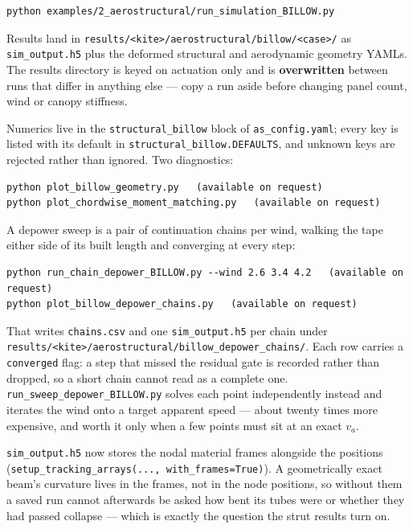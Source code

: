 \documentclass[11pt,a4paper]{article}
\newcommand{\code}[1]{\texttt{\small #1}}
\begin{document}
\begin{verbatim}
python examples/2_aerostructural/run_simulation_BILLOW.py
\end{verbatim}

Results land in \code{results/<kite>/aerostructural/billow/<case>/} as
\code{sim\_output.h5} plus the deformed structural and aerodynamic geometry
YAMLs. The results directory is keyed on actuation only and is
\textbf{overwritten} between runs that differ in anything else --- copy a run
aside before changing panel count, wind or canopy stiffness.

Numerics live in the \code{structural\_billow} block of \code{as\_config.yaml};
every key is listed with its default in \code{structural\_billow.DEFAULTS}, and
unknown keys are rejected rather than ignored. Two diagnostics:

\begin{verbatim}
python plot_billow_geometry.py   (available on request)
python plot_chordwise_moment_matching.py   (available on request)
\end{verbatim}

A depower sweep is a pair of continuation chains per wind, walking the tape
either side of its built length and converging at every step:

\begin{verbatim}
python run_chain_depower_BILLOW.py --wind 2.6 3.4 4.2   (available on request)
python plot_billow_depower_chains.py   (available on request)
\end{verbatim}

\noindent That writes \code{chains.csv} and one \code{sim\_output.h5} per chain
under \code{results/<kite>/aerostructural/billow\_depower\_chains/}. Each row
carries a \code{converged} flag: a step that missed the residual gate is
recorded rather than dropped, so a short chain cannot read as a complete one.
\code{run\_sweep\_depower\_BILLOW.py} solves each point independently instead
and iterates the wind onto a target apparent speed --- about twenty times more
expensive, and worth it only when a few points must sit at an exact $v_a$.

\code{sim\_output.h5} now stores the nodal material frames alongside the
positions (\code{setup\_tracking\_arrays(..., with\_frames=True)}). A
geometrically exact beam's curvature lives in the frames, not in the node
positions, so without them a saved run cannot afterwards be asked how bent its
tubes were or whether they had passed collapse --- which is exactly the question
the strut results turn on.
\end{document}
